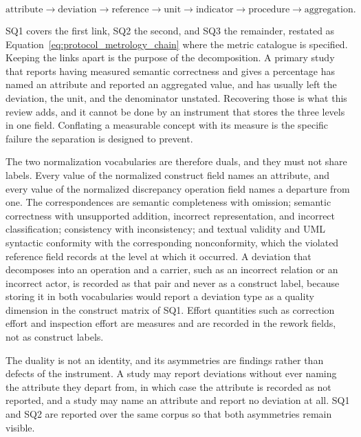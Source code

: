 \begin{equation}
\text{attribute} \rightarrow \text{deviation} \rightarrow \text{reference} \rightarrow \text{unit} \rightarrow \text{indicator} \rightarrow \text{procedure} \rightarrow \text{aggregation}.
\label{eq:protocol_quality_spine}
\end{equation}

SQ1 covers the first link, SQ2 the second, and SQ3 the remainder, restated as Equation~\ref{eq:protocol_metrology_chain} where the metric catalogue is specified. Keeping the links apart is the purpose of the decomposition. A primary study that reports having measured semantic correctness and gives a percentage has named an attribute and reported an aggregated value, and has usually left the deviation, the unit, and the denominator unstated. Recovering those is what this review adds, and it cannot be done by an instrument that stores the three levels in one field. Conflating a measurable concept with its measure is the specific failure the separation is designed to prevent.

The two normalization vocabularies are therefore duals, and they must not share labels. Every value of the normalized construct field names an attribute, and every value of the normalized discrepancy operation field names a departure from one. The correspondences are semantic completeness with omission; semantic correctness with unsupported addition, incorrect representation, and incorrect classification; consistency with inconsistency; and textual validity and UML syntactic conformity with the corresponding nonconformity, which the violated reference field records at the level at which it occurred. A deviation that decomposes into an operation and a carrier, such as an incorrect relation or an incorrect actor, is recorded as that pair and never as a construct label, because storing it in both vocabularies would report a deviation type as a quality dimension in the construct matrix of SQ1. Effort quantities such as correction effort and inspection effort are measures and are recorded in the rework fields, not as construct labels.

The duality is not an identity, and its asymmetries are findings rather than defects of the instrument. A study may report deviations without ever naming the attribute they depart from, in which case the attribute is recorded as not reported, and a study may name an attribute and report no deviation at all. SQ1 and SQ2 are reported over the same corpus so that both asymmetries remain visible.

